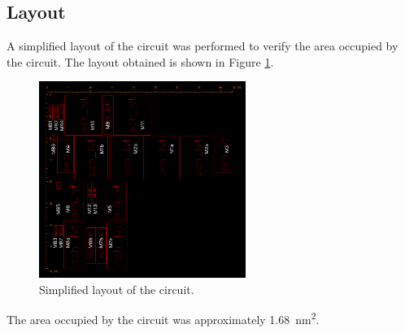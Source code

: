 \subsection{Layout}

A simplified layout of the circuit was performed to verify the area occupied by the circuit. The layout obtained is shown in Figure \ref{fig:layout}.

\begin{figure}[H]
    \centering
    \includegraphics[width=0.6\textwidth]{Images/layout.png}
    \caption{Simplified layout of the circuit.}
    \label{fig:layout}
\end{figure}

The area occupied by the circuit was approximately \SI{1.68}{\nano\meter\squared}.